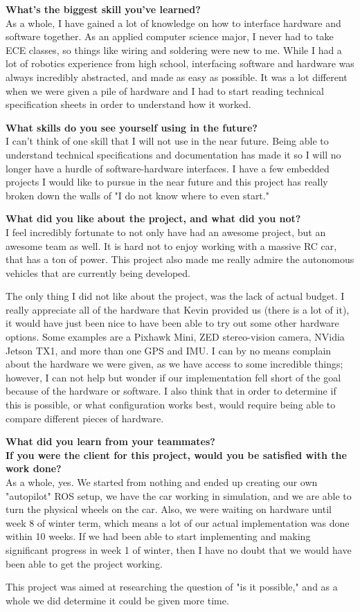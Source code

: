 \documentclass[compsoc,draftclsnofoot,onecolumn,10pt]{IEEEtran}
\begin{document}
\textbf{What's the biggest skill you've learned?}\\
As a whole, I have gained a lot of knowledge on how to interface hardware and software together. As an applied computer science major, I never had to take ECE classes, so things like wiring and soldering were new to me. While I had a lot of robotics experience from high school, interfacing software and hardware was always incredibly abstracted, and made as easy as possible. It was a lot different when we were given a pile of hardware and I had to start reading technical specification sheets in order to understand how it worked. 

\textbf{What skills do you see yourself using in the future?}\\
I can't think of one skill that I will not use in the near future. Being able to understand technical specifications and documentation has made it so I will no longer have a hurdle of software-hardware interfaces. I have a few embedded projects I would like to pursue in the near future and this project has really broken down the walls of "I do not know where to even start." 

\textbf{What did you like about the project, and what did you not?}\\
I feel incredibly fortunate to not only have had an awesome project, but an awesome team as well. It is hard not to enjoy working with a massive RC car, that has a ton of power. This project also made me really admire the autonomous vehicles that are currently being developed. \par
The only thing I did not like about the project, was the lack of actual budget. I really appreciate all of the hardware that Kevin provided us (there is a lot of it), it would have just been nice to have been able to try out some other hardware options. Some examples are a Pixhawk Mini, ZED stereo-vision camera, NVidia Jetson TX1, and more than one GPS and IMU. I can by no means complain about the hardware we were given, as we have access to some incredible things; however, I can not help but wonder if our implementation fell short of the goal because of the hardware or software. I also think that in order to determine if this is possible, or what configuration works best, would require being able to compare different pieces of hardware. 

\textbf{What did you learn from your teammates?}\\


\textbf{If you were the client for this project, would you be satisfied with the work done?}\\
As a whole, yes. We started from nothing and ended up creating our own "autopilot" ROS setup, we have the car working in simulation, and we are able to turn the physical wheels on the car. Also, we were waiting on hardware until week 8 of winter term, which means a lot of our actual implementation was done within 10 weeks. If we had been able to start implementing and making significant progress in week 1 of winter, then I have no doubt that we would have been able to get the project working. \par
This project was aimed at researching the question of "is it possible," and as a whole we did determine it could be given more time. 
\end{document}
